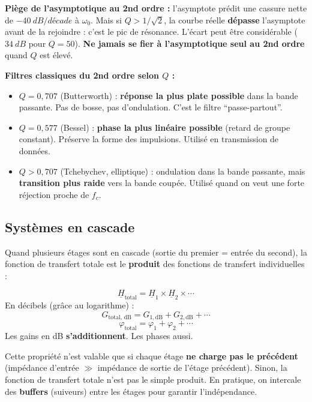 \documentclass[12pt,a4paper,twoside]{book}
\begin{document}
\begin{attention}
\textbf{Piège de l'asymptotique au 2nd ordre :} l'asymptote prédit une cassure nette de $-\SI{40}{dB/décade}$ à $\omega_0$. Mais si $Q > 1/\sqrt{2}$, la courbe réelle \textbf{dépasse} l'asymptote avant de la rejoindre : c'est le pic de résonance. L'écart peut être considérable ($\SI{34}{dB}$ pour $Q = 50$). \textbf{Ne jamais se fier à l'asymptotique seul au 2nd ordre} quand $Q$ est élevé.
\end{attention}

\begin{pratique}
\textbf{Filtres classiques du 2nd ordre selon $Q$ :}
\begin{itemize}[nosep]
\item $Q = 0{,}707$ (Butterworth) : \textbf{réponse la plus plate possible} dans la bande passante. Pas de bosse, pas d'ondulation. C'est le filtre ``passe-partout''.
\item $Q = 0{,}577$ (Bessel) : \textbf{phase la plus linéaire possible} (retard de groupe constant). Préserve la forme des impulsions. Utilisé en transmission de données.
\item $Q > 0{,}707$ (Tchebychev, elliptique) : ondulation dans la bande passante, mais \textbf{transition plus raide} vers la bande coupée. Utilisé quand on veut une forte réjection proche de $f_c$.
\end{itemize}
\end{pratique}

\subsection{Systèmes en cascade}

Quand plusieurs étages sont en cascade (sortie du premier = entrée du second), la fonction de transfert totale est le \textbf{produit} des fonctions de transfert individuelles :

\begin{formule}
\[
\underline{H}_{\text{total}} = \underline{H}_1 \times \underline{H}_2 \times \cdots
\]
En décibels (grâce au logarithme) :
\[
\boxed{G_{\text{total, dB}} = G_{1,\text{dB}} + G_{2,\text{dB}} + \cdots}
\]
\[
\boxed{\varphi_{\text{total}} = \varphi_1 + \varphi_2 + \cdots}
\]
Les gains en dB \textbf{s'additionnent}. Les phases aussi.
\end{formule}

\begin{attention}
Cette propriété n'est valable que si chaque étage \textbf{ne charge pas le précédent} (impédance d'entrée $\gg$ impédance de sortie de l'étage précédent). Sinon, la fonction de transfert totale n'est pas le simple produit. En pratique, on intercale des \textbf{buffers} (suiveurs) entre les étages pour garantir l'indépendance.
\end{attention}
\end{document}
